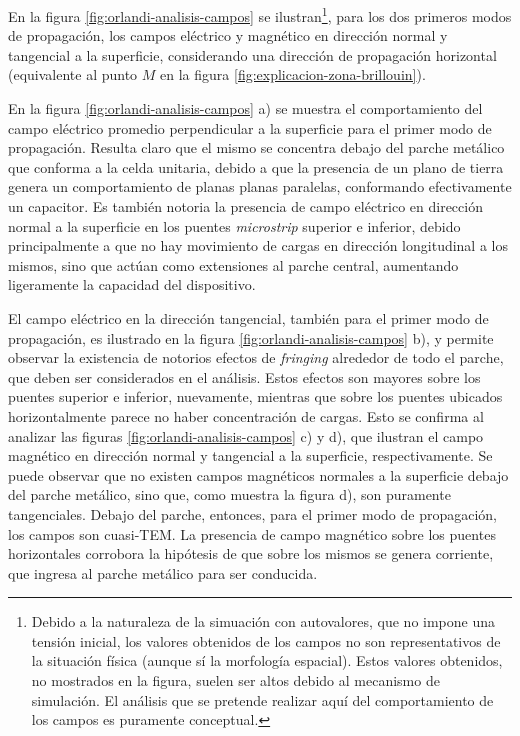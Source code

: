 En la figura \ref{fig:orlandi-analisis-campos} se ilustran\footnote{Debido a la naturaleza de la simuación con autovalores, que no impone una tensión inicial, los valores obtenidos de los campos no son representativos de la situación física (aunque sí la morfología espacial). Estos valores obtenidos, no mostrados en la figura, suelen ser altos debido al mecanismo de simulación. El análisis que se pretende realizar aquí del comportamiento de los campos es puramente conceptual.}, para los dos primeros modos de propagación, los campos eléctrico y magnético en dirección normal y tangencial a la superficie, considerando una dirección de propagación horizontal (equivalente al punto $M$ en la figura \ref{fig:explicacion-zona-brillouin}).

En la figura \ref{fig:orlandi-analisis-campos} a) se muestra el comportamiento del campo eléctrico promedio perpendicular a la superficie para el primer modo de propagación. Resulta claro que el mismo se concentra debajo del parche metálico que conforma a la celda unitaria, debido a que la presencia de un plano de tierra genera un comportamiento de planas planas paralelas, conformando efectivamente un capacitor. Es también notoria la presencia de campo eléctrico en dirección normal a la superficie en los puentes \textit{microstrip} superior e inferior, debido principalmente a que no hay movimiento de cargas en dirección longitudinal a los mismos, sino que actúan como extensiones al parche central, aumentando ligeramente la capacidad del dispositivo.

El campo eléctrico en la dirección tangencial, también para el primer modo de propagación, es ilustrado en la figura \ref{fig:orlandi-analisis-campos} b), y permite observar la existencia de notorios efectos de \textit{fringing} alrededor de todo el parche, que deben ser considerados en el análisis. Estos efectos son mayores sobre los puentes superior e inferior, nuevamente, mientras que sobre los puentes ubicados horizontalmente parece no haber concentración de cargas. Esto se confirma al analizar las figuras \ref{fig:orlandi-analisis-campos} c) y d), que ilustran el campo magnético en dirección normal y tangencial a la superficie, respectivamente. Se puede observar que no existen campos magnéticos normales a la superficie debajo del parche metálico, sino que, como muestra la figura d), son puramente tangenciales. Debajo del parche, entonces, para el primer modo de propagación, los campos son cuasi-TEM. La presencia de campo magnético sobre los puentes horizontales corrobora la hipótesis de que sobre los mismos se genera corriente, que ingresa al parche metálico para ser conducida.

